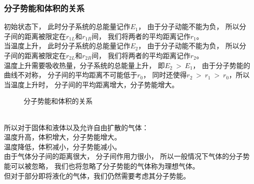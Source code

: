 \documentclass[UTF8]{ctexart}
\begin{document}
\newpage

\subsubsection{分子势能和体积的关系}
    初始状态下，
    此时分子系统的总能量记作$E_1$，
    由于分子动能不能为负，
    所以分子间的距离被限定在$r_{1L}$和$r_{1R}$间，
    我们将两者的平均距离记作$r_1$。\\[3mm]
    当温度上升，
    此时分子系统的总能量记作$E_2$，
    由于分子动能不能为负，
    所以分子间的距离被限定在$r_{2L}$和$r_{2R}$间，
    我们将两者的平均距离记作$r_2$。\\[3mm]
    温度上升需要吸收热量，分子系统的总能量上升，
    即$E_2~>~E_1$，
    由于分子势能的曲线不对称，
    分子间的平均距离不可能低于$r_0$，
    同时还使得$r_2~>~r_1~>~r_0$，所以当温度上升时，
    分子间的平均距离增大，分子势能增大。\\
    \begin{figure}[h]
        \begin{center}
            \caption{分子势能和体积的关系}
        \end{center}
    \end{figure}\\
    所以对于固体和液体以及允许自由扩散的气体：\\[2mm]
    温度升高，体积增大，分子势能增大。\\[1mm]
    温度降低，体积减小，分子势能减小。\\[3mm]
    由于气体分子间的距离很大，
    分子间作用力很小，
    所以一般情况下气体的分子势能可以被忽略，
    我们也将忽略了分子势能的气体称为理想气体。\\[3mm]
    但对于部分即将液化的气体，我们仍然需要考虑其分子势能。
\end{document}
